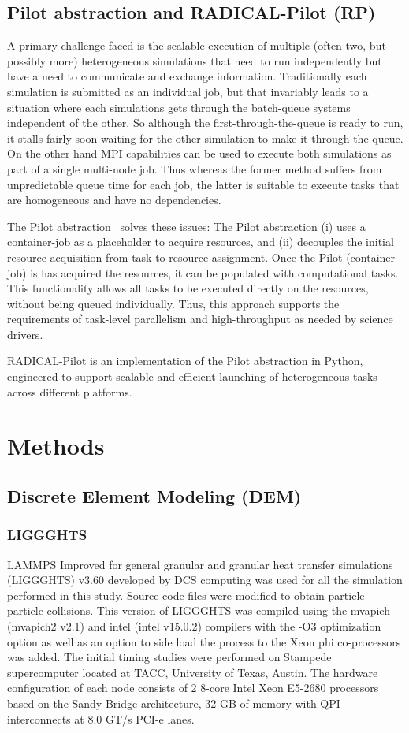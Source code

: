 \documentclass[preprint,11pt,authoryear]{elsarticle}
\begin{document}
\subsection{Pilot abstraction and RADICAL-Pilot (RP)}
A primary challenge faced is the scalable execution of multiple (often two,
but possibly more) heterogeneous simulations that need to run independently
but have a need to communicate and exchange information. Traditionally each
simulation is submitted as an individual job, but that invariably leads
to a situation where each simulations gets through the batch-queue systems
independent of the other. So although the first-through-the-queue is ready to
run, it stalls fairly soon waiting for the other simulation to make it through
the queue.  On the other hand MPI capabilities can be used to  execute both
simulations as part of a single multi-node job.  Thus whereas the former
method suffers from unpredictable queue time for each job, the latter is
suitable to execute tasks that are homogeneous and have no dependencies.


The Pilot abstraction~\cite{pstar12} solves these issues:  The Pilot abstraction 
(i) uses a container-job as a placeholder to acquire resources, and (ii) decouples 
the initial resource acquisition from task-to-resource assignment. Once the 
Pilot (container-job) is has acquired the resources, it can be populated with 
computational tasks. This functionality allows all tasks to be executed directly 
on the resources, without being queued individually. Thus, this approach supports 
the requirements of task-level parallelism and high-throughput as needed by 
science drivers.


RADICAL-Pilot is an implementation of the Pilot abstraction in Python, engineered to
support scalable and efficient launching of heterogeneous tasks across different platforms.
\section{Methods}

\subsection{Discrete Element Modeling (DEM)}
\subsubsection{LIGGGHTS}
LAMMPS Improved for general granular and granular heat transfer simulations (LIGGGHTS) v3.60 
developed by DCS computing was used for all the simulation performed in this study. 
Source code files were modified to obtain particle-particle 
collisions. This version of LIGGGHTS was compiled using the mvapich (mvapich2 v2.1) 
and intel (intel v15.0.2) compilers with the -O3 optimization option as well as an option to side load the 
process to the Xeon phi co-processors was added. The initial timing studies were performed on Stampede 
supercomputer located at TACC, University of Texas, Austin. The hardware configuration of each node 
consists of 2 8-core Intel Xeon E5-2680 processors based on the Sandy Bridge architecture, 32 GB of 
memory with QPI interconnects at 8.0 GT/s PCI-e lanes.
\end{document}
